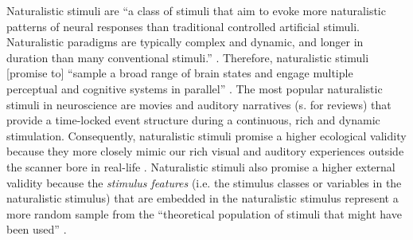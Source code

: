 Naturalistic stimuli are ``a class of stimuli that aim to evoke more
naturalistic patterns of neural responses than traditional controlled artificial
stimuli. Naturalistic paradigms are typically complex and dynamic, and longer in
duration than many conventional stimuli.'' \citep{vanderwal2019movies}.
%
Therefore, naturalistic stimuli [promise to] ``sample a broad range of brain
states and engage multiple perceptual and cognitive systems in parallel''
\citep{haxby2020naturalistic}.
The most popular naturalistic stimuli in neuroscience are movies and auditory
narratives (s. \citep{jaaskelainen2021movies, jaaskelainen2020neural} for
reviews) that provide a time-locked event structure during a continuous, rich
and dynamic stimulation.
%
Consequently, naturalistic stimuli promise a higher ecological validity
\citep{zaki2009need, hasson2012future, hamilton2018revolution} because they more
closely mimic our rich visual and auditory experiences outside the scanner bore
in real-life \citep{hasson2008neurocinematics, haxby2020naturalistic}.
%
Naturalistic stimuli also promise a higher external validity because the
\textit{stimulus features} (i.e. the stimulus classes or variables in the
naturalistic stimulus) that are embedded in the naturalistic stimulus represent
a more random sample from the ``theoretical population of stimuli that might
have been used'' \citep{westfall2016fixing}.
%


